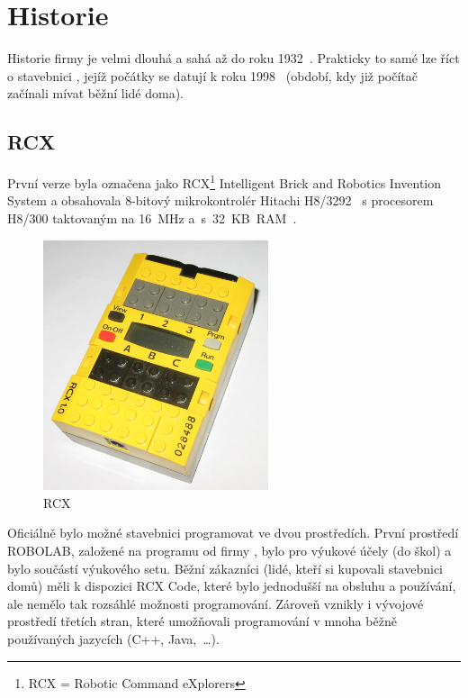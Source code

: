 \chapter{Historie \legoM}

Historie firmy \lego{ }je velmi dlouhá a sahá až do roku 1932~\cite{lego_GroupHistory1930s}. 
Prakticky to samé lze říct o stavebnici \legoM, jejíž počátky se datují k roku 1998~\cite{lego_mindstormsHistory} (období, kdy již počítač začínali mívat běžní lidé doma).


\section{\legoM{ }RCX}

První verze byla označena jako \legoM{ }RCX\footnote{RCX = Robotic Command eXplorers} Intelligent Brick and Robotics Invention System a  obsahovala 8-bitový mikrokontrolér Hitachi H8/3292~\cite{hitachi_microcontrolerH8series} s procesorem H8/300 taktovaným na 16~MHz a~s~32~KB~RAM~\cite{legoMindstormsRCX_Manual}.

\begin{figure}[h]
	\centering
	\includegraphics[width=250px]{images/lego-mindstorms-rcx_wikipedia.jpg}
	\caption[\legoM{ }RCX]{\legoM{ }RCX\protect\footnotemark}
	\label{fig:lego-mindstorms-rcx-wikipedia}
\end{figure}


Oficiálně bylo možné stavebnici programovat ve dvou prostředích. První prostředí ROBOLAB, založené na programu \labview{ }od firmy \NI, bylo pro výukové účely (do škol) a bylo součástí výukového setu. 
Běžní zákazníci (lidé, kteří si kupovali stavebnici domů) měli k dispozici RCX Code, které bylo jednodušší na obsluhu a používání, ale nemělo tak rozsáhlé možnosti programování. 
Zároveň vznikly i vývojové prostředí třetích stran, které umožňovali programování v mnoha běžně používaných jazycích (C++, Java,~\dots).

